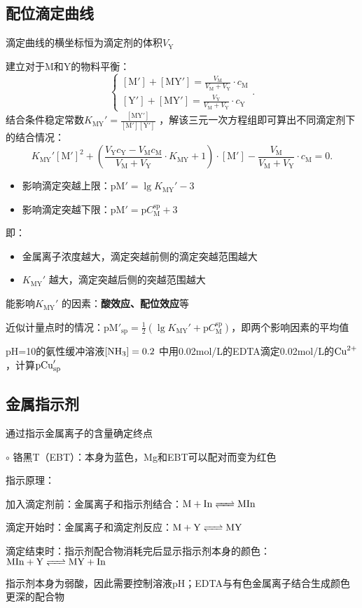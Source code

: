 \subsection{配位滴定曲线}%
\label{sub:配位滴定曲线}
\begin{notation}
    滴定曲线的横坐标恒为滴定剂的体积$V_\text{Y}$
\end{notation}
建立对于M和Y的物料平衡：\[
    \begin{cases}
        [\text{M}']+[\text{MY}']=\frac{V_\text{M}}{V_\text{M}+V_\text{Y}}\cdot c_\text{M}\\
        [\text{Y}']+[\text{MY}']=\frac{V_\text{Y}}{V_\text{M}+V_\text{Y}}\cdot c_\text{Y}
    \end{cases}
.\]
结合条件稳定常数$K_\text{MY}'=\frac{[\text{MY}']}{[\text{M}'][\text{Y}']}$ ，解该三元一次方程组即可算出不同滴定剂下的结合情况：\[
    K_\text{MY}'[\text{M}']^2 +\left( \frac{V_\text{Y}c_\text{Y}-V_\text{M}c_\text{M}}{V_\text{M}+V_\text{Y}}\cdot K_\text{MY}+1 \right)\cdot [\text{M}']-\frac{V_\text{M}}{V_\text{M}+V_\text{Y}}\cdot c_\text{M}=0
.\]
\begin{itemize}
    \item 影响滴定突越上限：$\text{pM}'=\lg K_\text{MY}'-3$
    \item 影响滴定突越下限：$\text{pM}'=\text{p}C_\text{M}^{\text{sp}}+3$
\end{itemize}
即：
\begin{itemize}
    \item 金属离子浓度越大，滴定突越前侧的滴定突越范围越大
    \item $K_\text{MY}'$ 越大，滴定突越后侧的突越范围越大
\end{itemize}
能影响$K_{\text{MY}}'$ 的因素：\textbf{酸效应、配位效应}等

近似计量点时的情况：$\text{pM}'_\text{sp}=\frac{1}{2}\left( \lg K_\text{MY}'+\text{p}C_\text{M}^{\text{sp}} \right)$，即两个影响因素的平均值
\begin{eg}
    pH=10的氨性缓冲溶液$[\ce{NH_3}]=0.2$ 中用0.02mol/L的EDTA滴定0.02mol/L的$\ce{Cu^2+}$，计算$\text{p}\ce{Cu}'_{\text{sp}}$
\end{eg}
\subsection{金属指示剂}%
\label{sub:金属指示剂}
\begin{notation}
    通过指示金属离子的含量确定终点
\end{notation}
$\circ$ 铬黑T（EBT）：本身为蓝色，Mg和EBT可以配对而变为红色
\begin{notation}
    指示原理：

    加入滴定剂前：金属离子和指示剂结合：$\ce{M +In}\ce{<=>[][]}\ce{MIn}$ 

    滴定开始时：金属离子和滴定剂反应：$\ce{M +Y}\ce{<=>[][]}\ce{MY}$ 

    滴定结束时：指示剂配合物消耗完后显示指示剂本身的颜色：$\ce{MIn +Y}\ce{<=>[][]}\ce{MY +In}$
\end{notation}
\begin{notation}
    指示剂本身为弱酸，因此需要控制溶液pH；EDTA与有色金属离子结合生成颜色更深的配合物
\end{notation}
